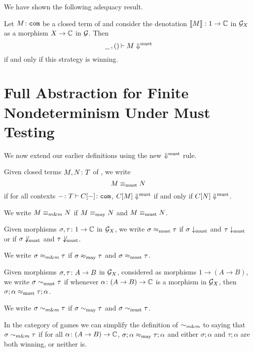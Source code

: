 We have shown the following adequacy result.
\begin{corollary}
  Let $M\colon {\mathtt{com}}$ be a closed term of \IAX and consider the denotation $\left\llbracket M\right\rrbracket \colon 1 \to \mathbb{C}$ in $\mathcal G_X$ as a morphism $X \to \mathbb{C}$ in $\mathcal G$.
  Then 
  \[
    \,\underline{\hspace{1.5ex}}\,,()\mathbin{\vdash} M\Downarrow^{\text{must}}
    \]
  if and only if this strategy is winning.
\end{corollary}

\section{Full Abstraction for Finite Nondeterminism Under Must Testing}

We now extend our earlier definitions using the new $\Downarrow^{\text{must}}$ rule.

\begin{definition}
  Given closed terms $M,N\colon T$ of \IAX, we write 
  \[
    M\equiv_{\operatorname{must}} N
    \]
  if for all contexts $-\colon T\mathbin{\vdash} C[-]\colon{\mathtt{com}}$, $C[M]\Downarrow^{\text{must}}$ if and only if $C[N]\Downarrow^{\text{must}}$.
\end{definition}

We write $M\mathrel{\equiv_{m\&m}} N$ if $M\equiv_{\operatorname{may}} N$ and $M\equiv_{\operatorname{must}} N$.

\begin{definition}
  Given morphisms $\sigma,\tau \colon 1 \to \mathbb{C}$ in $\mathcal G_X$, we write $\sigma\approx_{\operatorname{must}}\tau$ if $\sigma\downarrow_{\operatorname{must}}$ and $\tau\downarrow_{\operatorname{must}}$ or if $\sigma\not\downarrow_{\operatorname{must}}$ and $\tau\not\downarrow_{\operatorname{must}}$.  
\end{definition}

We write $\sigma\mathrel{\approx_{m\&m}} \tau$ if $\sigma\approx_{\operatorname{may}}\tau$ and $\sigma\approx_{\operatorname{must}}\tau$.

\begin{definition}
  Given morphisms $\sigma,\tau\colon A \to B$ in $\mathcal G_X$, considered as morphisms $1 \to (A \to B)$, we write $\sigma\sim_{\operatorname{must}}\tau$ if whenever $\alpha\colon (A \to B) \to \mathbb{C}$ is a morphism in $\mathcal G_X$, then $\sigma;\alpha\approx_{\operatorname{must}}\tau;\alpha$.
\end{definition}

We write $\sigma\mathrel{\sim_{m\&m}} \tau$ if $\sigma\sim_{\operatorname{may}}\tau$ and $\sigma\sim_{\operatorname{must}} \tau$.

\begin{remark}
  In the category of games we can simplify the definition of $\mathrel{\sim_{m\&m}}$ to saying that $\sigma\mathrel{\sim_{m\&m}} \tau$ if for all $\alpha\colon (A \to B) \to \mathbb{C}$, $\sigma;\alpha\approx_{\operatorname{may}}\tau;\alpha$ and either $\sigma;\alpha$ and $\tau;\alpha$ are both winning, or neither is.
\end{remark}

